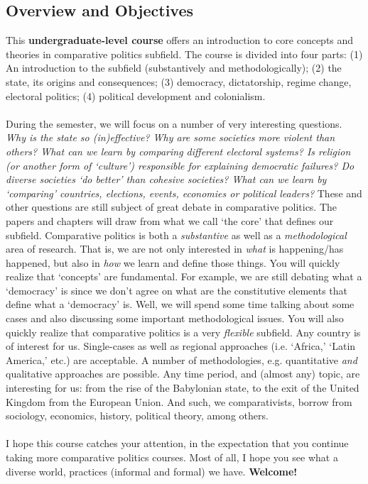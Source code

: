 \documentclass[letterpaper]{article}
\begin{document}
\subsection*{Overview and Objectives}

This {\bf {\color{blue}undergraduate-level course}} offers an introduction to core concepts and theories in comparative politics subfield. The course is divided into four parts: (1) An introduction to the subfield  (substantively and methodologically); (2) the state, its origins and consequences; (3) democracy, dictatorship, regime change, electoral politics; (4) political development and colonialism.
\\
\\
During the semester, we will focus on a number of very interesting questions. \emph{Why is the state so (in)effective? Why are some societies more violent than others? What can we learn by comparing different electoral systems? Is religion (or another form of `culture') responsible for explaining democratic failures? Do diverse societies `do better' than cohesive societies? What can we learn by `comparing' countries, elections, events, economies or political leaders?} These and other questions are still subject of great debate in comparative politics. The papers and chapters will draw from what we call `the core' that defines our subfield. Comparative politics is both a \emph{substantive} as well as a \emph{methodological} area of research. That is, we are not only interested in \emph{what} is happening/has happened, but also in \emph{how} we learn and define those things. You will quickly realize that `concepts' are fundamental. For example, we are still debating what a `democracy' is since we don't agree on what are the constitutive elements that define what a `democracy' is. Well, we will spend some time talking about some cases and also discussing some important methodological issues. You will also quickly realize that comparative politics is a very \emph{flexible} subfield. Any country is of interest for us. Single-cases as well as regional approaches (i.e. `Africa,' `Latin America,' etc.) are acceptable. A number of methodologies, e.g. quantitative \emph{and} qualitative approaches are possible. Any time period, and (almost any) topic, are interesting for us: from the rise of the Babylonian state, to the exit of the United Kingdom from the European Union. And such, we comparativists, borrow from sociology, economics, history, political theory, among others. 
\\
\\
I hope this course catches your attention, in the expectation that you continue taking more comparative politics courses. Most of all, I hope you see what a diverse world, practices (informal and formal) we have. {\bf Welcome!}
\end{document}
